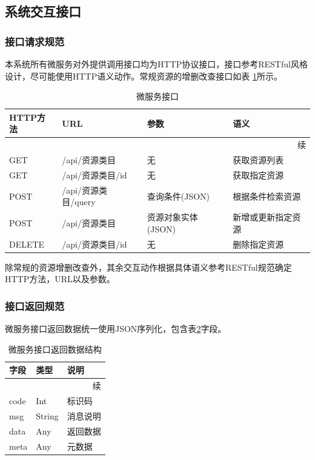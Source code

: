 \documentclass[titlepage,UTF8,linespread=1.5]{ctexart}
\begin{document}
\subsection{系统交互接口}
\subsubsection{接口请求规范}
本系统所有微服务对外提供调用接口均为HTTP协议接口，接口参考RESTful风格设计，尽可能使用HTTP语义动作。常规资源的增删改查接口如表
\ref{tab:api}所示。\par
\begin{longtable}{|p{5em}|p{10em}|p{10em}|p{10em}|}
    \caption{微服务接口}\label{tab:api}                                        \\\hline
    HTTP方法 & URL                   & 参数               & 语义               \\\hline
    \endfirsthead
    \multicolumn{4}{r}{{续\tablename\thetable{}}}                              \\\hline
    \endhead
    GET      & /api/{资源类目}       & 无                 & 获取资源列表       \\\hline
    GET      & /api/{资源类目}/{id}  & 无                 & 获取指定资源       \\\hline
    POST     & /api/{资源类目}/query & 查询条件(JSON)     & 根据条件检索资源   \\\hline
    POST     & /api/{资源类目}       & 资源对象实体(JSON) & 新增或更新指定资源 \\\hline
    DELETE   & /api/{资源类目}/{id}  & 无                 & 删除指定资源       \\\hline
\end{longtable}
除常规的资源增删改查外，其余交互动作根据具体语义参考RESTful规范确定HTTP方法，URL以及参数。\par

\subsubsection{接口返回规范}
微服务接口返回数据统一使用JSON序列化，包含表\ref{tab:rest-result}字段。\par
\begin{longtable}{|p{10em}|p{10em}|p{10em}|}
    \caption{微服务接口返回数据结构}\label{tab:rest-result} \\\hline
    字段 & 类型   & 说明                                    \\\hline
    \endfirsthead
    \multicolumn{3}{r}{{续\tablename\thetable{}}}           \\\hline
    \endhead
    code & Int    & 标识码                                  \\\hline
    msg  & String & 消息说明                                \\\hline
    data & Any    & 返回数据                                \\\hline
    meta & Any    & 元数据                                  \\\hline
\end{longtable}
\end{document}
